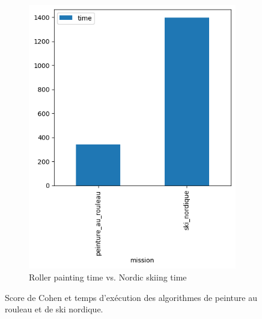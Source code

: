 \documentclass[francais,RandD]{rapportPFE}
\begin{document}
\begin{figure}[h!]
\begin{subfigure}[t]{0.49\linewidth}
					\includegraphics[width=\linewidth]{graphics/peinture_au_rouleau-time_vs_ski_nordique-time.png}
					\caption{Roller painting time vs. Nordic skiing time}
					\label{fig:peinture_au_rouleau-time_vs_ski_nordique-time}
			\end{subfigure}
			\caption{Score de Cohen et temps d'exécution des algorithmes de peinture au rouleau et de ski nordique.}
			\label{fig:peinture_au_rouleau_vs_ski_nordique}
		\end{figure}
\end{document}
